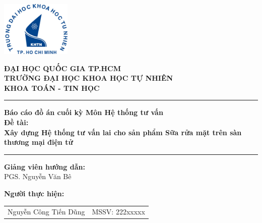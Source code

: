 \begin{center}
    \includegraphics[width=0.25\textwidth]{Logo/Logo-KHTN.jpg}
\end{center}

\thispagestyle{empty}

\vspace{0.5cm}

\begin{center}
    \textbf{\Large ĐẠI HỌC QUỐC GIA TP.HCM}\\[0.3cm]
    \textbf{\Large TRƯỜNG ĐẠI HỌC KHOA HỌC TỰ NHIÊN}\\[0.3cm]
    \textbf{\large KHOA TOÁN - TIN HỌC}
\end{center}

\vspace{0.5cm}
\rule{\linewidth}{2pt}
\vspace{0.5cm}

\begin{center}
    \textbf{\LARGE Báo cáo đồ án cuối kỳ Môn Hệ thống tư vấn}\\[1cm]
    \textbf{\Large Đề tài: \\
    Xây dựng Hệ thống tư vấn lai cho sản phẩm Sữa rửa mặt trên sàn thương mại điện tử}
\end{center}

\vspace{1cm}

\vspace{0.5cm}
\rule{\linewidth}{2pt}
\vspace{0.5cm}

\begin{center}
\textbf{Giảng viên hướng dẫn:}\\
PGS. Nguyễn Văn Bê
\end{center}

\vspace{0.5cm}

\begin{center}
\textbf{Người thực hiện:} \\[0.3cm]
\begin{tabular}{ll}
Nguyễn Công Tiến Dũng & MSSV: 222xxxxx
\end{tabular}
\end{center}

\vfill

